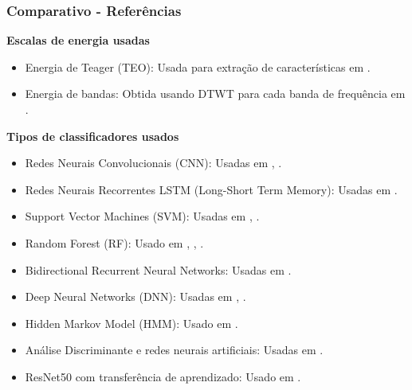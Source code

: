 \begin{frame}[allowframebreaks]
	\frametitle{Comparativo - Referências}
	
	\par \textbf{Escalas de energia usadas}
	\begin{itemize}
		\item Energia de Teager (TEO): Usada para extração de características em \cite{MOCTEZUMA2019201}.
		\item Energia de bandas: Obtida usando DTWT para cada banda de frequência em \cite{Hernandez-Del-ToroTonatiuh2021TaEB}.
	\end{itemize}
	
	\par \textbf{Tipos de classificadores usados}
	\begin{itemize}
		\item Redes Neurais Convolucionais (CNN): Usadas em \cite{PanachakelJerrinRamakrishnan}, \cite{MahapatraNrushinghCharan2022MCoI}.
		\item Redes Neurais Recorrentes LSTM (Long-Short Term Memory): Usadas em \cite{AbdulghaniMokhlesM2023ISCU}.
		\item Support Vector Machines (SVM): Usadas em \cite{ShahUzair2022TRoA}, \cite{Hernandez-Del-ToroTonatiuh2021TaEB}.
		\item Random Forest (RF): Usado em \cite{AgarwalPrabhakar2022Ebia}, \cite{Hernandez-Del-ToroTonatiuh2021TaEB}, \cite{MOCTEZUMA2019201}.
		\item Bidirectional Recurrent Neural Networks: Usadas em \cite{MahapatraNrushinghCharan2023Ecoi}.
		\item Deep Neural Networks (DNN): Usadas em \cite{Panachakel_2019}, \cite{panachakel2020novel}.
		\item Hidden Markov Model (HMM): Usado em \cite{WOS:000525844000004}.
		\item Análise Discriminante e redes neurais artificiais: Usadas em \cite{ali2022speech}.
		\item ResNet50 com transferência de aprendizado: Usado em \cite{PanachakelJerrinRamakrishnan}.
	\end{itemize}
	

\end{frame}
